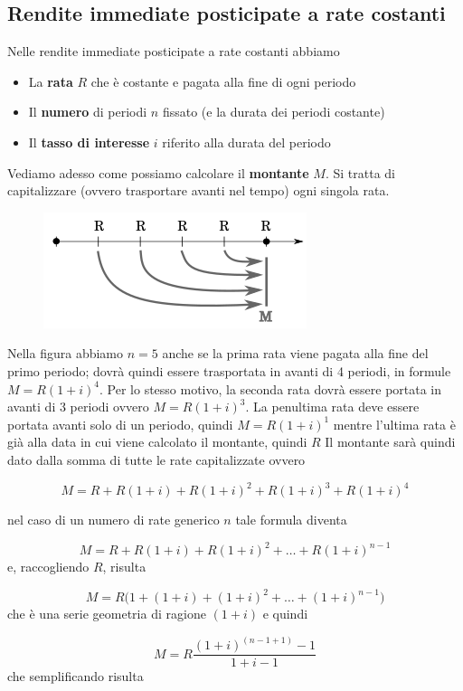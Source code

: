 \subsection{Rendite immediate posticipate a rate costanti} Nelle rendite 
immediate posticipate a rate costanti abbiamo \begin{itemize} \item La 
\textbf{rata} $R$ che è costante e pagata alla fine di ogni periodo \item Il 
\textbf{numero} di periodi $n$ fissato (e la durata dei periodi costante) \item 
Il \textbf{tasso di interesse} $i$ riferito alla durata del periodo 
\end{itemize} Vediamo adesso come possiamo calcolare il \textbf{montante} $M$. 
Si tratta di capitalizzare (ovvero trasportare avanti nel tempo) ogni singola 
rata. \begin{figure}[htp] \centering 
\includegraphics[scale=1]{img/posticipata.png}

\end{figure}

Nella figura abbiamo $n=5$ anche se la prima rata viene pagata alla fine del 
primo periodo; dovrà quindi essere trasportata in avanti di 4 periodi, in 
formule $M=R(1+i)^4$. Per lo stesso motivo, la seconda rata dovrà essere portata 
in avanti di 3 periodi ovvero $M=R(1+i)^3$. La penultima rata deve essere 
portata avanti solo di un periodo, quindi $M=R(1+i)^1$ mentre l'ultima rata è 
già alla data in cui viene calcolato il montante, quindi $R$ Il montante sarà 
quindi dato dalla somma di tutte le rate capitalizzate ovvero

$$M=R+R(1+i)+R(1+i)^2+R(1+i)^3+R(1+i)^4$$

nel caso di un numero di rate generico $n$ tale formula diventa

$$M=R+R(1+i)+R(1+i)^2+\dots+R(1+i)^{n-1}$$ e, raccogliendo $R$, risulta

$$M=R\big(1+(1+i)+(1+i)^2+\dots+(1+i)^{n-1}\big)$$ che è una serie geometria di 
ragione $(1+i)$ e quindi

$$M=R\dfrac{(1+i)^{(n-1+1)}-1}{1+i-1} $$ che semplificando risulta

